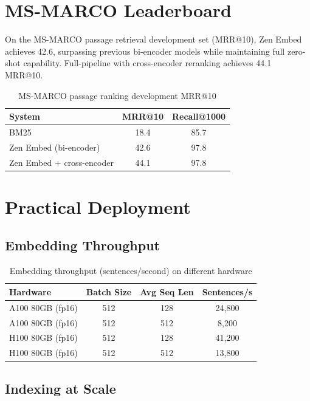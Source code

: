 \documentclass[11pt,a4paper]{article}
\begin{document}
\section{MS-MARCO Leaderboard}

On the MS-MARCO passage retrieval development set (MRR@10), Zen Embed achieves 42.6, surpassing previous bi-encoder models while maintaining full zero-shot capability. Full-pipeline with cross-encoder reranking achieves 44.1 MRR@10.

\begin{table}[H]
\centering
\caption{MS-MARCO passage ranking development MRR@10}
\label{tab:msmarco}
\begin{tabular}{lcc}
\toprule
System & MRR@10 & Recall@1000 \\
\midrule
BM25 & 18.4 & 85.7 \\
Zen Embed (bi-encoder) & 42.6 & 97.8 \\
Zen Embed + cross-encoder & 44.1 & 97.8 \\
\bottomrule
\end{tabular}
\end{table}

\section{Practical Deployment}

\subsection{Embedding Throughput}

\begin{table}[H]
\centering
\caption{Embedding throughput (sentences/second) on different hardware}
\label{tab:throughput}
\begin{tabular}{lccc}
\toprule
Hardware & Batch Size & Avg Seq Len & Sentences/s \\
\midrule
A100 80GB (fp16) & 512 & 128 & 24,800 \\
A100 80GB (fp16) & 512 & 512 & 8,200 \\
H100 80GB (fp16) & 512 & 128 & 41,200 \\
H100 80GB (fp16) & 512 & 512 & 13,800 \\
\bottomrule
\end{tabular}
\end{table}

\subsection{Indexing at Scale}
\end{document}
